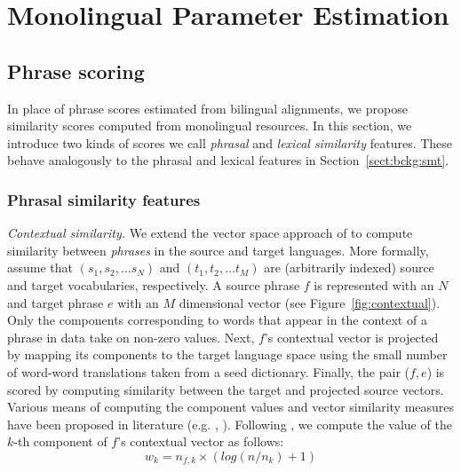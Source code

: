 \documentclass[11pt]{article}
\newcommand{\secref}[1]{Section~\ref{#1}}
\newcommand{\figref}[1]{Figure~\ref{#1}}
\newcommand{\paraheader}[1]{\vskip 0.05in \noindent\emph{#1}}
\begin{document}

\section{Monolingual Parameter Estimation} \label{sect:mono}

\subsection{Phrase scoring} \label{sect:score}

In place of phrase scores estimated from bilingual alignments, we propose similarity scores computed  from monolingual resources.  In this section, we introduce two kinds of scores we call {\em phrasal} and {\em lexical similarity} features.  
These behave analogously to the phrasal and lexical features in \secref{sect:bckg:smt}.

\subsubsection{Phrasal similarity features} \label{sect:phrasalfeats}

\paraheader{Contextual similarity.}  We extend the vector space approach of  to compute similarity between \emph{phrases} in the source and target languages.  More formally, assume that $(s_{1}, s_{2}, \dots s_{N})$ and $(t_{1}, t_{2}, \dots t_{M})$ are (arbitrarily indexed) source and target vocabularies, respectively.  A source phrase $f$ is represented with an $N$ and target phrase $e$ with an $M$ dimensional vector (see \figref{fig:contextual}).  Only the components corresponding to words that appear in the context of a phrase in data take on non-zero values. Next, $f$'s contextual vector is projected by mapping its components to the target language space using the small number of word-word translations taken from a seed dictionary.
Finally, the pair ($f, e$) is scored by computing similarity between the target  and projected source vectors.  Various means of computing the component values and vector similarity measures have been proposed in literature (e.g. , ).  Following , we compute the value of the $k$-th component of $f$'s contextual vector  as follows: 
\begin{equation*}
w_{k} = n_{f,k} \times (log( {n / n_{k}}) + 1)
\end{equation*}
\end{document}
